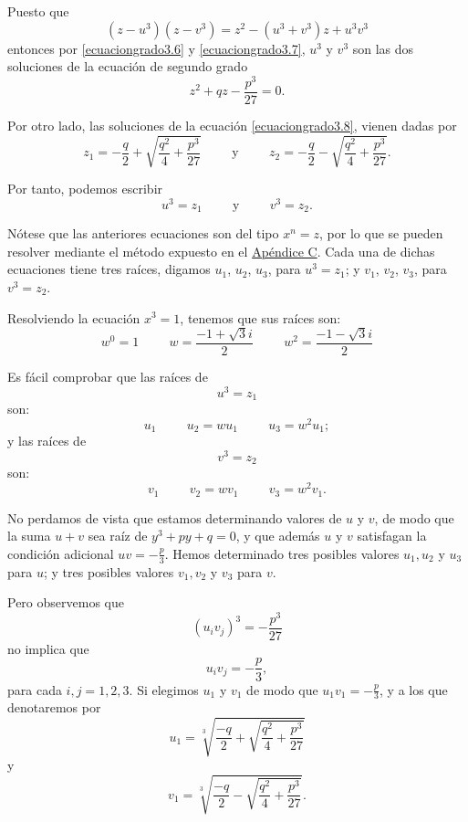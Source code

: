 Puesto que
$$(z-u^3)(z-v^3)=z^2-(u^3+v^3)z+u^3v^3$$
entonces por \eqref{ecuaciongrado3.6} y \eqref{ecuaciongrado3.7}, $u^3$ y $v^3$ son las dos soluciones de la ecuación de segundo grado
\begin{equation}
    z^2+qz-\frac{p^3}{27}=0. \label{ecuaciongrado3.8}
\end{equation}

Por otro lado, las soluciones de la ecuación \eqref{ecuaciongrado3.8}, vienen dadas por
$$z_1=-\frac{q}{2}+\sqrt{\frac{q^2}{4}+\frac{p^3}{27}} \hspace{1cm} \text{y} \hspace{1cm} z_2=-\frac{q}{2}-\sqrt{\frac{q^2}{4}+\frac{p^3}{27}}.$$\newpage

Por tanto, podemos escribir
\begin{equation}
    u^3=z_1 \hspace{1cm} \text{y} \hspace{1cm} v^3=z_2. \label{ecuaciongrado3.9}
\end{equation}

Nótese que las anteriores ecuaciones son del tipo $x^n=z$, por lo que se pueden resolver mediante el método expuesto en el \hyperref[FUNDAMENTAL]{Apéndice C}. Cada una de dichas ecuaciones tiene tres raíces, digamos $u_1$, $u_2$, $u_3$, para $u^3=z_1$; y $v_1$, $v_2$, $v_3$, para $v^3=z_2$.

Resolviendo la ecuación $x^3=1$, tenemos que sus raíces son:
$$w^0=1 \hspace{1cm} w=\frac{-1+\sqrt{3}i}{2} \hspace{1cm} w^2=\frac{-1-\sqrt{3}i}{2}$$

Es fácil comprobar que las raíces de
$$u^3=z_1$$
son:
$$u_1 \hspace{1cm} u_2=wu_1 \hspace{1cm} u_3=w^2u_1;$$
y las raíces de
$$v^3=z_2$$
son:
$$v_1 \hspace{1cm} v_2=wv_1 \hspace{1cm} v_3=w^2v_1.$$

No perdamos de vista que estamos determinando valores de $u$ y $v$, de modo que la suma $u+v$ sea raíz de $y^3+py+q=0$, y que además $u$ y $v$ satisfagan la condición adicional $\displaystyle uv=-\frac{p}{3}$. Hemos determinado tres posibles valores $u_1,  u_2$ y $u_3$ para $u$; y tres posibles valores $v_1,  v_2$ y $v_3$ para $v$.

Pero observemos que
$$\left(u_i v_j\right)^3=-\frac{p^3}{27}$$
no implica que
$$u_i v_j=-\frac{p}{3},$$
para cada $i,  j=1,  2,  3$. Si elegimos $u_1$ y $v_1$ de modo que $\displaystyle u_1v_1=-\frac{p}{3}$, y a los que denotaremos por
\begin{equation}
    u_1=\sqrt[3]{\frac{-q}{2}+\sqrt{\frac{q^2}{4}+\frac{p^3}{27}}} \label{APPCOSIPA1}
\end{equation}
y
\begin{equation}
    v_1=\sqrt[3]{\frac{-q}{2}-\sqrt{\frac{q^2}{4}+\frac{p^3}{27}}}. \label{APPCOSIPA2}
\end{equation}

